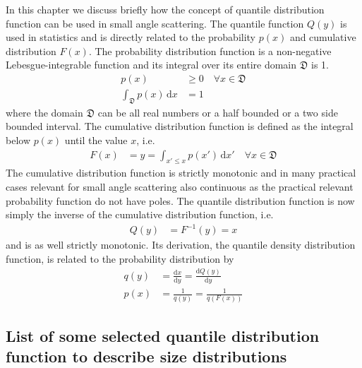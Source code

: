 In this chapter we discuss briefly how the concept of quantile distribution function can be used in small angle scattering. The quantile function $Q(y)$ is used in statistics and is directly related to the probability $p(x)$ and cumulative distribution $F(x)$. The probability distribution function is a non-negative Lebesgue-integrable function and its integral over its entire domain $\mathfrak{D}$ is 1.
\begin{align}\label{eq:pdf}
  p(x) & \geq 0 \quad \forall x \in \mathfrak{D} \\
  \int_{\mathfrak{D}} p(x) \, \mathrm{d}x &= 1
\end{align}
where the domain $\mathfrak{D}$ can be all real numbers or a half bounded or a two side bounded interval.
The cumulative distribution function is defined as the integral below $p(x)$ until the value $x$, i.e.
\begin{align}\label{eq:cdf}
  F(x) & = y =\int_{x'\leq x} p(x')\, \mathrm{d}x' \quad \forall x \in \mathfrak{D}
\end{align}
The cumulative distribution function is strictly monotonic and in many practical cases relevant for small angle scattering also continuous as the practical relevant probability function do not have poles. The quantile distribution function is now simply the inverse of the cumulative distribution function, i.e.
\begin{align}\label{eq:qdf}
  Q(y) &= F^{-1}(y) = x
\end{align}
and is as well strictly monotonic. Its derivation, the quantile density distribution function, is related to the probability distribution by
\begin{align}\label{eq:qddf}
  q(y) & = \frac{\mathrm{d}x}{\mathrm{d}y} = \frac{\mathrm{d}Q(y)}{\mathrm{d}y} \\
  p(x) &= \frac{1}{q(y)} = \frac{1}{q\left(F(x)\right)}
\end{align}

\subsection{List of some selected quantile distribution function to describe size distributions} ~\\

